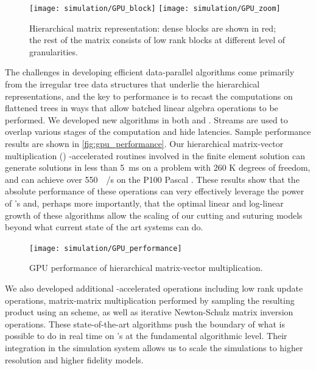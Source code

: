 \begin{figure}
  \centering%
	\texttt{[image: simulation/GPU\_block]}\vspace{2ex}
	\texttt{[image: simulation/GPU\_zoom]}\\
	\caption{Hierarchical matrix representation: dense blocks are shown in red; the rest of the matrix consists of low rank blocks at different level of granularities.}\label{fig:gpu_matrix}
\end{figure}

The challenges in developing efficient data-parallel  algorithms come primarily from the irregular tree data structures that underlie the hierarchical representations, and the key to performance is to recast the computations on flattened trees in ways that allow batched linear algebra operations to be performed. We developed new  algorithms in both  and . Streams are used to overlap various stages of the computation and hide latencies. Sample performance results are shown in \autoref{fig:gpu_performance}. Our hierarchical matrix-vector multiplication
() -accelerated routines involved in the finite element solution can generate solutions in less than \SI{5}{\milli\second} on a problem with 260 K degrees of freedom, and can achieve over \SI{550}{\giga\byte/\second} on the P100 Pascal . These results show that the absolute performance of these operations can very effectively leverage the power of 's and, perhaps more importantly, that the optimal linear and log-linear growth of these algorithms allow the scaling of our cutting and suturing models beyond what current state of the art systems can do.

\begin{figure}
  \centering%
	\texttt{[image: simulation/GPU\_performance]}
	\caption{GPU performance of hierarchical matrix-vector multiplication.}\label{fig:gpu_performance}
\end{figure}

We also developed additional -accelerated operations including low rank update operations, matrix-matrix multiplication performed by sampling the resulting product using an  scheme,  as well as iterative Newton-Schulz matrix inversion operations.  These state-of-the-art algorithms push the boundary of what is possible to do in real time on 's at the fundamental algorithmic level. Their integration in the simulation system allows us to scale the simulations to higher resolution and higher fidelity models.

